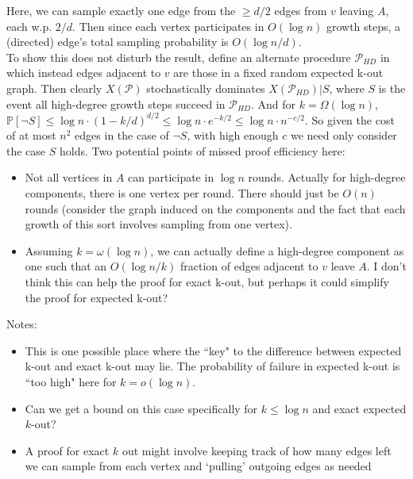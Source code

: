 \documentclass{article}
\begin{document}
	Here, we can sample exactly one edge from the $\ge d/2$ edges from $v$ leaving $A$, each w.p. $2/d$. Then since each vertex participates in $O(\log n)$ growth steps, a (directed) edge's total sampling probability is $O(\log n/d)$.\\
	To show this does not disturb the result, define an alternate procedure $\mathcal P_{HD}$ in which instead edges adjacent to $v$ are those in a fixed random expected k-out graph. Then clearly $X(\mathcal P)$ stochastically dominates $X(\mathcal P_{HD}) | S$, where $S$ is the event all high-degree growth steps succeed in $\mathcal P_{HD}$. And for $k = \Omega (\log n)$, $\mathbb P[\neg S] \le \log n \cdot (1 - k / d)^{d / 2} \le \log n \cdot e^{-k / 2} \le \log n \cdot n^{-c / 2}$. So given the cost of at most $n^2$ edges in the case of $\neg S$, with high enough $c$ we need only consider the case $S$ holds.
	Two potential points of missed proof efficiency here:
	\begin{itemize}
		\item Not all vertices in $A$ can participate in $\log n$ rounds. Actually for high-degree components, there is one vertex per round. There should just be $O(n)$ rounds (consider the graph induced on the components and the fact that each growth of this sort involves sampling from one vertex).
		\item Assuming $k = \omega(\log n)$, we can actually define a high-degree component as one such that an $O(\log n / k)$ fraction of edges adjacent to $v$ leave $A$. I don't think this can help the proof for exact k-out, but perhaps it could simplify the proof for expected k-out?
	\end{itemize}
	Notes:
		\begin{itemize}
			\item This is one possible place where the ``key" to the difference between expected k-out and exact k-out may lie. The probability of failure in expected k-out is ``too high" here for $k = o(\log n)$.
			\item Can we get a bound on this case specifically for $k \leq \log n$ and exact expected $k$-out?
			\item A proof for exact $k$ out might involve keeping track of how many edges left we can sample from each vertex and `pulling' outgoing edges as needed
		\end{itemize}
\end{document}
